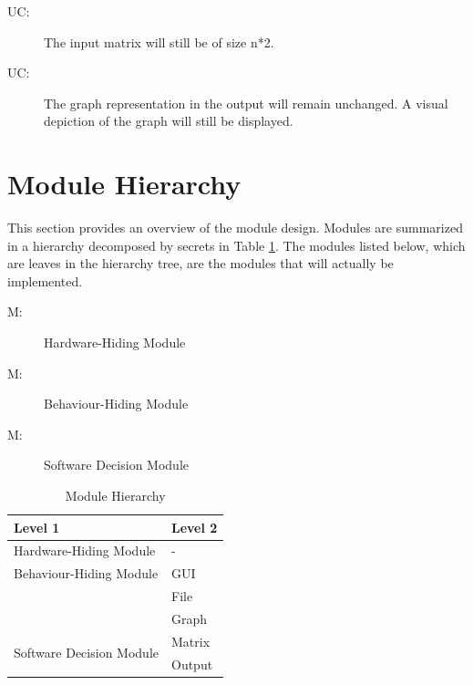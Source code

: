 \documentclass[12pt, titlepage]{article}
\newcounter{ucnum}
\newcommand{\uctheucnum}{UC\theucnum}
\newcounter{mnum}
\newcommand{\mthemnum}{M\themnum}
\begin{document}
\begin{description}
\item[ \uctheucnum \label{ucIO}:] The input matrix will still be of size n*2.
\item[ \uctheucnum \label{measure}:] The graph representation in the output will remain unchanged. A visual depiction of the graph will still be displayed.
\end{description}

\section{Module Hierarchy} \label{SecMH}

This section provides an overview of the module design. Modules are summarized
in a hierarchy decomposed by secrets in Table \ref{TblMH}. The modules listed
below, which are leaves in the hierarchy tree, are the modules that will
actually be implemented.

\begin{description}
\item [ \mthemnum \label{mHH}:] Hardware-Hiding Module
\item [ \mthemnum \label{mHH}:] Behaviour-Hiding Module
\item [ \mthemnum \label{mHH}:] Software Decision Module
\end{description}


\begin{table}[h!]
\centering
\begin{tabular}{p{} p{}}
\toprule
\textbf{Level 1} & \textbf{Level 2}\\
\midrule

{Hardware-Hiding Module} & - \\
\midrule

{Behaviour-Hiding Module} & GUI\\ & File\\ & Graph\\
\midrule

\multirow{3}{0.3\textwidth}{Software Decision Module} & Matrix\\ & Output\\
\bottomrule

\end{tabular}
\caption{Module Hierarchy}
\label{TblMH}
\end{table}
\end{document}
